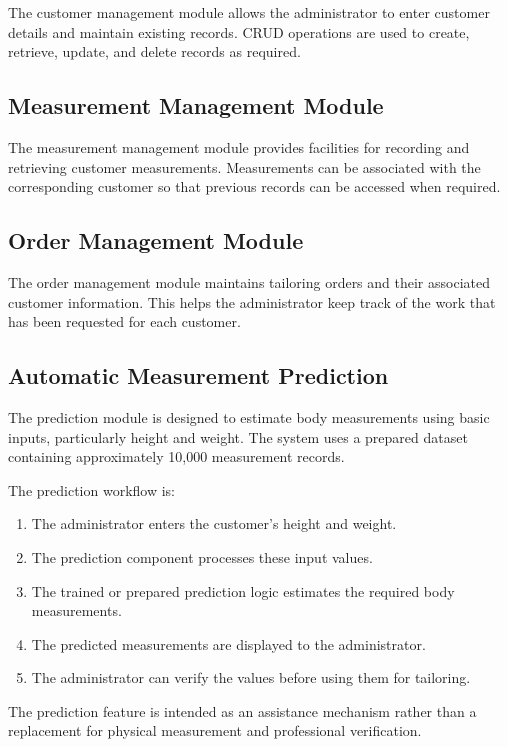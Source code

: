 \documentclass[12pt,a4paper]{report}
\begin{document}
The customer management module allows the administrator to enter customer
details and maintain existing records. CRUD operations are used to create,
retrieve, update, and delete records as required.

\subsection{Measurement Management Module}

The measurement management module provides facilities for recording and
retrieving customer measurements. Measurements can be associated with the
corresponding customer so that previous records can be accessed when
required.

\subsection{Order Management Module}

The order management module maintains tailoring orders and their associated
customer information. This helps the administrator keep track of the work
that has been requested for each customer.

\subsection{Automatic Measurement Prediction}

The prediction module is designed to estimate body measurements using basic
inputs, particularly height and weight. The system uses a prepared dataset
containing approximately 10,000 measurement records.

The prediction workflow is:

\begin{enumerate}
  \item The administrator enters the customer's height and weight.
  \item The prediction component processes these input values.
  \item The trained or prepared prediction logic estimates the required body
        measurements.
  \item The predicted measurements are displayed to the administrator.
  \item The administrator can verify the values before using them for
        tailoring.
\end{enumerate}

The prediction feature is intended as an assistance mechanism rather than a
replacement for physical measurement and professional verification.
\end{document}
